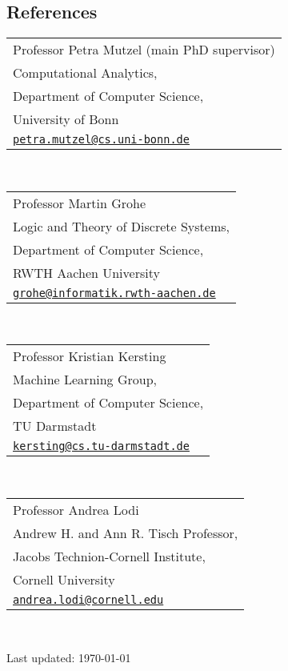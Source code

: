 \documentclass[11pt, a4paper, DIV=12]{scrartcl}
\begin{document}
\subsection*{References}

\begin{tabular}{l}
	Professor Petra Mutzel (main PhD supervisor)\\
	Computational Analytics,\\ 
	Department of Computer Science,\\
	University of Bonn \\
	\href{mailto:petra.mutzel@cs.uni-bonn.de}{\texttt{petra.mutzel@cs.uni-bonn.de}}\\
\end{tabular}\\[0.5em]


\begin{tabular}{l}
	Professor Martin Grohe\\
	Logic and Theory of Discrete Systems,\\ 
	Department of Computer Science,\\
	RWTH Aachen University \\
	\href{mailto:grohe@informatik.rwth-aachen.de}{\texttt{grohe@informatik.rwth-aachen.de}}\\
\end{tabular}\\[0.5em]

\begin{tabular}{l}
	Professor Kristian Kersting\\ 
	Machine Learning Group,\\
	Department of Computer Science,\\
	TU Darmstadt\\
	\href{mailto:kersting@cs.tu-darmstadt.de}{\texttt{kersting@cs.tu-darmstadt.de}}\\
\end{tabular}\\[0.5em]

\begin{tabular}{l}
	Professor Andrea Lodi\\
	Andrew H. and Ann R. Tisch Professor,\\
	Jacobs Technion-Cornell Institute,\\
	Cornell University\\
	\href{mailto:andrea.lodi@cornell.edu}{\texttt{andrea.lodi@cornell.edu}}\\
\end{tabular}\\[0.5em]



\vfill{} 
\begin{center}
{\scriptsize Last updated: \today}
\end{center}
\end{document}
